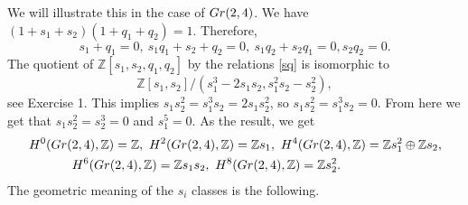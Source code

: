 \documentclass[11pt]{article}
\numberwithin{equation}{section}
\numberwithin{footnote}{section}
\newcommand{\Gr}{{\rm Gr}}
\newcommand{\Z}{{\mathbb Z}}
\begin{document}
\smallskip
We will illustrate this in the case of $\Gr(2,4)$.
We have $(1+s_1+s_2)(1+q_1+q_2)=1$. Therefore,
\begin{equation}\label{sq}
s_1+ q_1 = 0,~ s_1 q_1 + s_2 + q_2 = 0,~ s_1 q_2 + s_2 q_1 =0, s_2 q_2 = 0.
\end{equation}
The quotient of $\Z[s_1,s_2,q_1,q_2]$ by the relations \eqref{sq} is isomorphic to
$$
\Z[s_1,s_2]/(s_1^3 - 2 s_1 s_2, s_1^2 s_2 - s_2^2),
$$
see Exercise 1. 
This implies $s_1s_2^2=s_1^3 s_2 =2 s_1 s_2^2$, so $s_1 s_2^2 = s_1^3s_2=0$. From here we get that $s_1 s_2^2=s_2^3=0$ and $s_1^5=0$.  As the result, we get
\begin{align*}
H^{0}(\Gr(2,4),\Z) = \Z ,~H^{2}(\Gr(2,4),\Z) = \Z s_1,~H^4(\Gr(2,4),\Z) = \Z s_1^2 \oplus \Z s_2,\\
H^{6}(\Gr(2,4),\Z) = \Z s_1s_2,~H^{8}(\Gr(2,4),\Z) = \Z s_2^2.\hskip 80pt
\end{align*}
The geometric meaning of the $s_i$ classes is the following. 
\end{document}
